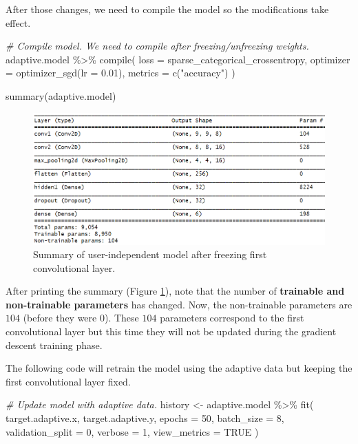 \documentclass[
  11pt,
]{krantz}
\newenvironment{Shaded}{\begin{snugshade}}{\end{snugshade}}
\newcommand{\AttributeTok}[1]{\textcolor[rgb]{0.61,0.61,0.61}{#1}}
\newcommand{\CommentTok}[1]{\textcolor[rgb]{0.37,0.37,0.37}{\textit{#1}}}
\newcommand{\ConstantTok}[1]{\textcolor[rgb]{0,0,0}{#1}}
\newcommand{\DecValTok}[1]{\textcolor[rgb]{0.06,0.06,0.06}{#1}}
\newcommand{\FloatTok}[1]{\textcolor[rgb]{0.06,0.06,0.06}{#1}}
\newcommand{\FunctionTok}[1]{\textcolor[rgb]{0,0,0}{#1}}
\newcommand{\NormalTok}[1]{#1}
\newcommand{\OtherTok}[1]{\textcolor[rgb]{0.37,0.37,0.37}{#1}}
\newcommand{\SpecialCharTok}[1]{\textcolor[rgb]{0,0,0}{#1}}
\newcommand{\StringTok}[1]{\textcolor[rgb]{0.5,0.5,0.5}{#1}}
\begin{document}
After those changes, we need to compile the model so the modifications take effect.

\begin{Shaded}
\begin{Highlighting}[]
\CommentTok{\# Compile model. We need to compile after freezing/unfreezing weights.}
\NormalTok{adaptive.model }\SpecialCharTok{\%\textgreater{}\%} \FunctionTok{compile}\NormalTok{(}
  \AttributeTok{loss =} \StringTok{\textquotesingle{}sparse\_categorical\_crossentropy\textquotesingle{}}\NormalTok{,}
  \AttributeTok{optimizer =} \FunctionTok{optimizer\_sgd}\NormalTok{(}\AttributeTok{lr =} \FloatTok{0.01}\NormalTok{),}
  \AttributeTok{metrics =} \FunctionTok{c}\NormalTok{(}\StringTok{"accuracy"}\NormalTok{)}
\NormalTok{)}

\FunctionTok{summary}\NormalTok{(adaptive.model)}
\end{Highlighting}
\end{Shaded}

\begin{figure}

{\centering \includegraphics[width=0.9\linewidth]{images/adaptive_summary2} 

}

\caption{Summary of user-independent model after freezing first convolutional layer.}\label{fig:adaptSummary2}
\end{figure}

After printing the summary (Figure \ref{fig:adaptSummary2}), note that the number of \textbf{trainable and non-trainable parameters} has changed. Now, the non-trainable parameters are \(104\) (before they were \(0\)). These \(104\) parameters correspond to the first convolutional layer but this time they will not be updated during the gradient descent training phase.

The following code will retrain the model using the adaptive data but keeping the first convolutional layer fixed.

\begin{Shaded}
\begin{Highlighting}[]
\CommentTok{\# Update model with adaptive data.}
\NormalTok{history }\OtherTok{\textless{}{-}}\NormalTok{ adaptive.model }\SpecialCharTok{\%\textgreater{}\%} \FunctionTok{fit}\NormalTok{(}
\NormalTok{  target.adaptive.x, target.adaptive.y,}
  \AttributeTok{epochs =} \DecValTok{50}\NormalTok{,}
  \AttributeTok{batch\_size =} \DecValTok{8}\NormalTok{,}
  \AttributeTok{validation\_split =} \DecValTok{0}\NormalTok{,}
  \AttributeTok{verbose =} \DecValTok{1}\NormalTok{,}
  \AttributeTok{view\_metrics =} \ConstantTok{TRUE}
\NormalTok{)}
\end{Highlighting}
\end{Shaded}
\end{document}
